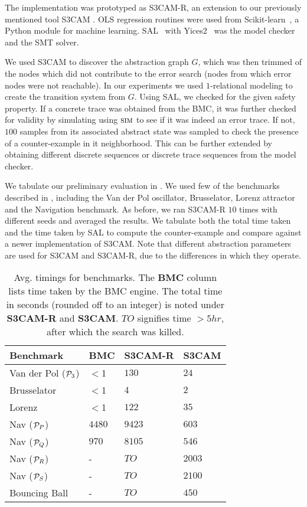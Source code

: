 
The implementation was prototyped as S3CAM-R, an extension to our
previously mentioned tool S3CAM \cite{zutshi2014multiple}. OLS regression
routines were used from Scikit-learn~\cite{pedregosa2011scikit}, a
Python module for machine learning. SAL~\cite{SAL-SRI}
with Yices2~\cite{dutertre2014yices} was the model checker and the SMT
solver.

We used S3CAM to discover the abstraction graph $G$, which was then
trimmed of the nodes which did not contribute to the error search
(nodes from which error nodes were not reachable). In our experiments we
used $1$-relational modeling to create the transition system from $G$.
Using SAL, we checked for the given safety property. If a concrete
trace was obtained from the BMC, it was further checked for validity
by simulating using $\mbox{\sc sim}$ to see if it was indeed an error
trace.  If not, $100$ samples from its associated abstract state was
sampled to check the presence of a counter-example in it
neighborhood. This can be further extended by obtaining different
discrete sequences or discrete trace sequences from the model checker.

We tabulate our preliminary evaluation in . We used
few of the benchmarks described in \cite{zutshi2014multiple}, including the Van
der Pol oscillator, Brusselator, Lorenz attractor and the Navigation
benchmark. As before, we ran S3CAM-R $10$ times with different seeds
and averaged the results. We tabulate both the total time taken and
the time taken by SAL to compute the counter-example and compare
against a newer implementation of S3CAM. Note that different
abstraction parameters are used for S3CAM and S3CAM-R, due to the
differences in which they operate.

\begin{table}[!htbp]
\centering
\caption{Avg. timings for benchmarks. The \textbf{BMC} column lists
time taken by the BMC engine. The total time in seconds (rounded off
to an integer) is noted under \textbf{S3CAM-R} and \textbf{S3CAM}.
$TO$ signifies time $>5hr$, after which the search was killed.}
\label{tab:res-rel}
\begin{tabular}{@{}llll@{}}
\toprule
Benchmark & BMC & S3CAM-R & S3CAM\\
\midrule
Van der Pol ($\mathcal{P}_3$)   &$<$1 & $130$ & $24$\\
Brusselator               &$<$1  & $4$    & $2$\\
Lorenz                    &$<$1 & $122$  & $35$\\
Nav ($\mathcal{P}_P$)           &$4480$ &$9423$   &$603$ \\
Nav ($\mathcal{P}_Q$)           &$970$  &$8105$   &$546$ \\
Nav ($\mathcal{P}_R$)           &-  &$TO$   & $2003$\\
Nav ($\mathcal{P}_S$)           &-  &$TO$   & $2100$\\
Bouncing Ball             &-  &$TO$   & $450$\\

\bottomrule
\end{tabular}
\end{table}


